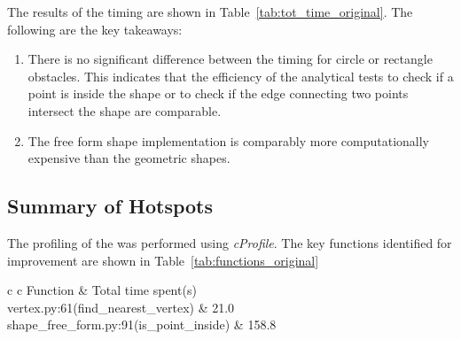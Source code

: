 The results of the timing are shown in Table~\ref{tab:tot_time_original}. The following are the key takeaways:
\begin{enumerate}
\item There is no significant difference between the timing for circle or rectangle obstacles. This indicates that the efficiency of the analytical tests to check if a point is inside the shape or to check if the edge connecting two points intersect the shape are comparable.
\item The free form shape implementation is comparably more computationally expensive than the geometric shapes.
\end{enumerate}
\subsection{Summary of Hotspots}
The profiling of the was performed using \textit{cProfile}. The key functions identified for improvement are shown in Table~\ref{tab:functions_original}
\begin{table}[H]
\centering
{\tabulinesep=2.0mm
\begin{tabu}{c c}
		\hline
		Function & Total time spent(s) \\
		\hline
		vertex.py:61(find\_nearest\_vertex) & 21.0 \\
		shape\_free\_form.py:91(is\_point\_inside) & 158.8 \\
		\hline
\end{tabu}
}
\caption{\label{tab:functions_original} Average total time spent in bottleneck functions for 2000 basic RRT steps. For free form the average time is that of the seahorse obstacle}
\end{table}

